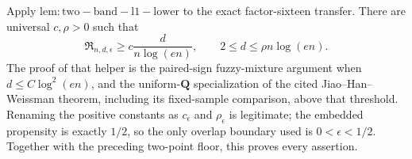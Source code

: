 Apply \(\mathrm{lem:two-band-l1-lower}\) to the exact factor-sixteen transfer.  There are universal \(c,\rho>0\) such that
\[
 \mathfrak R_{n,d,\epsilon}
 \ge c\frac d{n\log(en)},
 \qquad
 2\le d\le\rho n\log(en).
\]
The proof of that helper is the paired-sign fuzzy-mixture argument when \(d\le C\log^2(en)\), and the uniform-\(\mathbf Q\) specialization of the cited Jiao--Han--Weissman theorem, including its fixed-sample comparison, above that threshold.  Renaming the positive constants as \(c_\epsilon\) and \(\rho_\epsilon\) is legitimate; the embedded propensity is exactly \(1/2\), so the only overlap boundary used is \(0<\epsilon<1/2\).  Together with the preceding two-point floor, this proves every assertion.